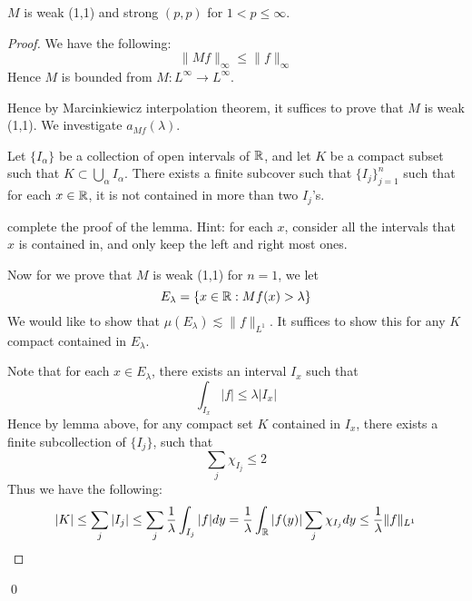 \begin{theorem}
    $M$ is weak (1,1) and strong $(p,p)$ for $1<p\leq\infty$.
\end{theorem}
\begin{proof}
    We have the following:
    \begin{equation*}
        \|Mf\|_\infty\leq\|f\|_{\infty}
    \end{equation*}
    Hence $M$ is bounded from $M:L^\infty\to L^\infty$.
    
    Hence by Marcinkiewicz interpolation theorem, it suffices to prove that $M$ is weak (1,1). We investigate $a_{Mf}(\lambda)$. 
    \begin{lemma}
        Let $\{I_\alpha\}$ be a collection of open intervals of $\mathbb{R}$, and let $K$ be a compact subset such that $K\subset\bigcup_\alpha I_\alpha$. There exists a finite subcover such that $\{I_j\}_{j=1}^n$ such that for each $x\in \mathbb{R}$, it is not contained in more than two $I_j$'s.
    \end{lemma}
    \begin{exercise}
        complete the proof of the lemma. Hint: for each $x$, consider all the intervals that $x$ is contained in, and only keep the left and right most ones.
    \end{exercise}

    Now for we prove that $M$ is weak (1,1) for \textbf{$n=1$}, we let
    \begin{equation*}
        E_\lambda=\{x\in\mathbb{R}: Mf(x)>\lambda\}
    \end{equation*}
    We would like to show that $\mu(E_\lambda)\lesssim \|f\|_{L^1}$. It suffices to show this for any $K$ compact contained in $E_\lambda$.

    Note that for each $x\in E_\lambda$, there exists an interval $I_x$ such that 
    \begin{equation*}
        \int_{I_x}|f|\leq\lambda|I_x|
    \end{equation*}
    Hence by lemma above, for any compact set $K$ contained in $I_x$, there exists a finite subcollection of $\{I_j\}$, such that 
    \begin{equation*}
        \sum_j\chi_{I_j}\leq 2
    \end{equation*}
    Thus we have the following:
    \begin{equation*}
        |K|\leq\sum_j|I_j|\leq\sum_j\frac{1}{\lambda}\int_{I_j}|f|dy= \frac{1}{\lambda}\int_{\mathbb{R}}|f(y)|\sum_j\chi_{I_j}dy\leq \frac{1}{\lambda}\|f\|_{L^1}
    \end{equation*}
\end{proof}
\qed


